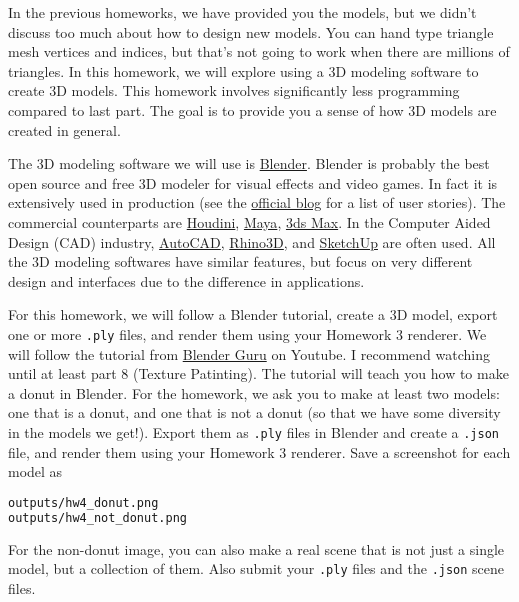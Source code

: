 




In the previous homeworks, we have provided you the models, but we didn't discuss too much about how to design new models. You can hand type triangle mesh vertices and indices, but that's not going to work when there are millions of triangles. In this homework, we will explore using a 3D modeling software to create 3D models. This homework involves significantly less programming compared to last part. The goal is to provide you a sense of how 3D models are created in general.

The 3D modeling software we will use is \href{https://www.blender.org/}{Blender}. Blender is probably the best open source and free 3D modeler for visual effects and video games. In fact it is extensively used in production (see the \href{https://www.blender.org/get-involved/user-stories/}{official blog} for a list of user stories). The commercial counterparts are \href{https://www.sidefx.com/products/houdini/}{Houdini}, \href{https://www.autodesk.com/products/maya/overview}{Maya}, \href{https://www.autodesk.com/products/3ds-max/overview}{3ds Max}. In the Computer Aided Design (CAD) industry, \href{https://en.wikipedia.org/wiki/AutoCAD}{AutoCAD}, \href{https://www.rhino3d.com/}{Rhino3D}, and \href{https://www.sketchup.com/}{SketchUp} are often used. All the 3D modeling softwares have similar features, but focus on very different design and interfaces due to the difference in applications.

For this homework, we will follow a Blender tutorial, create a 3D model, export one or more \lstinline{.ply} files, and render them using your Homework 3 renderer. We will follow the tutorial from \href{https://www.youtube.com/playlist?list=PLjEaoINr3zgFX8ZsChQVQsuDSjEqdWMAD}{Blender Guru} on Youtube. I recommend watching until at least part 8 (Texture Patinting). The tutorial will teach you how to make a donut in Blender. For the homework, we ask you to make at least two models: one that is a donut, and one that is not a donut (so that we have some diversity in the models we get!). Export them as \lstinline{.ply} files in Blender and create a \lstinline{.json} file, and render them using your Homework 3 renderer. Save a screenshot for each model as
\begin{lstlisting}[language=bash]
outputs/hw4_donut.png
outputs/hw4_not_donut.png
\end{lstlisting}
For the non-donut image, you can also make a real scene that is not just a single model, but a collection of them. Also submit your \lstinline{.ply} files and the \lstinline{.json} scene files.

